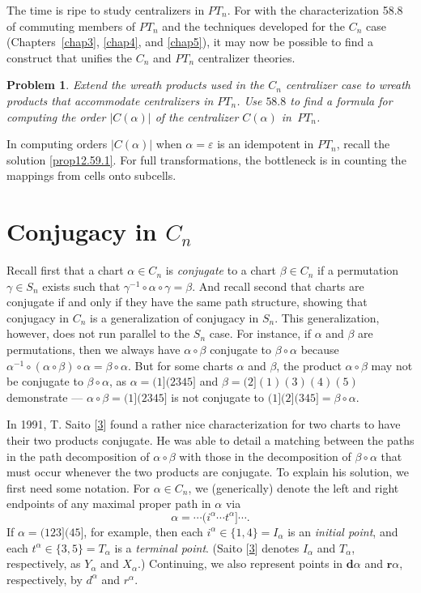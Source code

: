 \documentclass{surv-l}
\numberwithin{equation}{section}
\numberwithin{table}{section}
\numberwithin{figure}{section}
\newtheorem{problem}[equation]{Problem}
\theoremstyle{definition}
\begin{document}
The time is ripe to study centralizers in $PT_{n}$. For with the
characterization 58.8 of commuting members of $PT_{n}$ and the
techniques developed for the $C_{n}$ case (Chapters~\ref{chap3},
\ref{chap4}, and \ref{chap5}), it may now be possible to find a
construct that unifies the $C_{n}$ and $PT_{n}$ centralizer
theories.

\begin{problem}\label{prob13.62.2}
Extend the wreath products used in the $C_{n}$ centralizer case to
wreath products that accommodate centralizers in $PT_{n}$. Use
$58.8$ to find a formula for computing the order $|C(\alpha)|$ of
the centralizer $C(\alpha)$ in~$PT_{n}$.
\end{problem}

In computing orders $|C(\alpha)|$ when $\alpha=\varepsilon$ is an
idempotent in $PT_{n}$, recall the solution \ref{prop12.59.1}. For
full transformations, the bottleneck is in counting the mappings
from cells onto subcells.

\section{Conjugacy in $C_{n}$}\label{sec13.63}

Recall first that a chart $\alpha\in C_{n}$ is \emph{conjugate} to
a chart $\beta\in C_{n}$ if a permutation $\gamma\in S_{n}$ exists
such that $\gamma^{-1}\circ\alpha \circ\gamma=\beta$. And recall
second that charts are conjugate if and only if they have the same
path structure, showing that conjugacy in $C_{n}$ is a
generalization of conjugacy in $S_{n}$. This generalization,
however, does not run parallel to the $S_{n}$ case. For instance,
if $\alpha$ and $\beta$ are permutations, then we always have
$\alpha \circ\beta$ conjugate to $\beta \circ\alpha$ because
$\alpha^{-1}\circ (\alpha\circ\beta)\circ\alpha=\beta
\circ\alpha$. But for some charts $\alpha$ and $\beta$, the
product $\alpha \circ\beta$ may not be conjugate to $\beta
\circ\alpha$, as $\alpha=(1](2345]$ and $\beta=(2](1)(3)(4)(5)$
demonstrate --- $\alpha \circ\beta=(1](2345]$ is not conjugate to
$(1](2](345]=\beta\circ\alpha$.

In 1991, T. Saito
[\hyperlink{bib67b}{3}] found a rather nice
characterization for two charts to have their two products
conjugate. He was able to detail a matching between the paths in
the path decomposition of $\alpha \circ\beta$ with those in the
decomposition of $\beta \circ\alpha$ that must occur whenever the
two products are conjugate. To explain his solution, we first need
some notation. For $\alpha\in C_{n}$, we (generically) denote the
left and right endpoints of any maximal proper path in
$\alpha$ via
\[
\alpha=\cdots(i^{\alpha}\cdots t^{\alpha}]\cdots.
\]
If $\alpha=(123](45]$, for example, then each
$i^{\alpha}\in\{1,4\}=I_{\alpha}$ is an \emph{initial point}, and each
$t^{\alpha}\in\{3,5\}=T_{\alpha}$ is a \emph{terminal point}.
(Saito [\hyperlink{bib67b}{3}] denotes
$I_{\alpha}$ and $T_{\alpha}$, respectively, as $Y_{\alpha}$ and
$X_{\alpha}.$) Continuing, we also represent points in
$\mathbf{d}\alpha$ and $\mathbf{r}\alpha$, respectively, by
$d^{\alpha}$ and $r^{\alpha}$.
\end{document}
